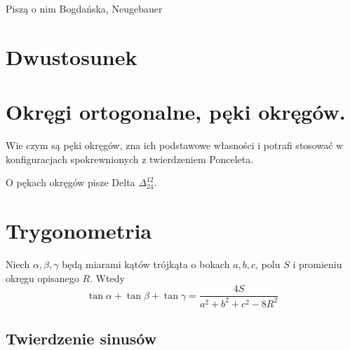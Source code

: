 Piszą o nim Bogdańska, Neugebauer \cite[s. 74]{neugebauer_2018}

\section{Dwustosunek}

\section{Okręgi ortogonalne, pęki okręgów.}
Wie czym są pęki okręgów, zna ich podstawowe własności i potrafi stosować w konfiguracjach spokrewnionych z twierdzeniem Ponceleta.   

O pękach okręgów pisze Delta $\Delta_{24}^{12}$.



\section{Trygonometria}

\begin{proposition}
	Niech $\alpha, \beta, \gamma$ będą miarami kątów trójkąta o bokach $a, b, c$, polu $S$ i promieniu okręgu opisanego $R$.
	Wtedy
	\begin{equation}
		\tan \alpha + \tan \beta + \tan \gamma = \frac{4S}{a^2 + b^2 + c^2 - 8R^2}
	\end{equation}
\end{proposition}

\begin{theorem}
\end{theorem}



\subsection{Twierdzenie sinusów}

